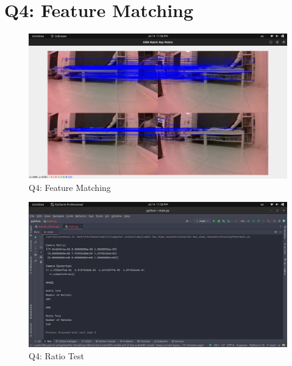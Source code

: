 \documentclass[a4paper, 12pt]{article}
\begin{document}
    \section{Q4: Feature Matching}
    
    \begin{figure}
		\caption{Q4: Feature Matching}
		\includegraphics[scale=0.25]{img/matching1.png}
	\end{figure}

    \begin{figure}
		\caption{Q4:  Ratio Test}
		\includegraphics[scale=0.25]{img/matching2.png}
	\end{figure}
\end{document}
